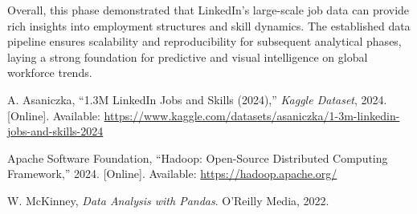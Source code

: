 \documentclass[conference]{IEEEtran}
\begin{document}
Overall, this phase demonstrated that LinkedIn’s large-scale job data can provide rich insights into employment structures and skill dynamics. The established data pipeline ensures scalability and reproducibility for subsequent analytical phases, laying a strong foundation for predictive and visual intelligence on global workforce trends.



\begin{thebibliography}{00}

A. Asaniczka, “1.3M LinkedIn Jobs and Skills (2024),” \textit{Kaggle Dataset}, 2024. [Online]. Available: \url{https://www.kaggle.com/datasets/asaniczka/1-3m-linkedin-jobs-and-skills-2024}

Apache Software Foundation, “Hadoop: Open-Source Distributed Computing Framework,” 2024. [Online]. Available: \url{https://hadoop.apache.org/}

W. McKinney, \textit{Data Analysis with Pandas}. O’Reilly Media, 2022.



\end{thebibliography}
\end{document}
